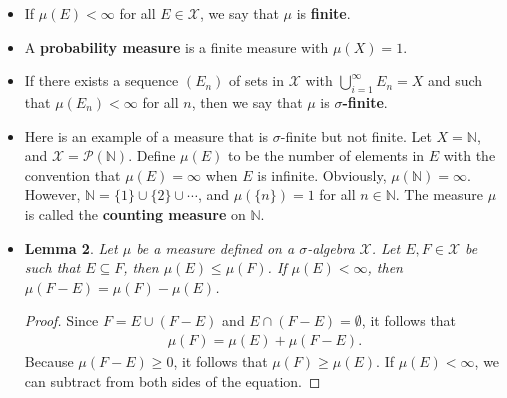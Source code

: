\documentclass[10pt]{article}
\newtheorem{lemma}{Lemma}
\newtheorem{definition}[lemma]{Definition}
\newcommand{\mcal}[1]{\mathcal{#1}}
\begin{document}
\begin{itemize}
  \begin{definition}
    Let $(X, \mcal{X})$ be a measurable space. A {\bf measure} is a function $\mu: \mcal{X} \rightarrow [0, \infty]$ with the following properties.
    \begin{enumerate}
      \item $\mu(\emptyset) = 0$.
      \item $\mu$ is {\bf countably additive}. That is, for a sequence $(E_n)$ of disjoint sets, it holds that
      \begin{align*}
        \mu\bigg( \bigcup_{n=1}^\infty E_n \bigg) = \sum_{n=1}^\infty \mu(E_n).
      \end{align*}
    \end{enumerate}
  \end{definition}
  
  \item If $\mu(E) < \infty$ for all $E \in \mcal{X}$, we say that $\mu$ is {\bf finite}.
  
  \item A {\bf probability measure} is a finite measure with $\mu(X) = 1$.
  
  \item If there exists a sequence $(E_n)$ of sets in $\mcal{X}$ with $\bigcup_{i=1}^\infty E_n = X$ and such that $\mu(E_n) < \infty$ for all $n$, then we say that $\mu$ is {\bf $\sigma$-finite}.
  
  \item Here is an example of a measure that is $\sigma$-finite but not finite. Let $X = \mathbb{N}$, and $\mcal{X} = \mcal{P}(\mathbb{N})$. Define $\mu(E)$ to be the number of elements in $E$ with the convention that $\mu(E) = \infty$ when $E$ is infinite. Obviously, $\mu(\mathbb{N}) = \infty$. However, $\mathbb{N} = \{ 1 \} \cup \{ 2 \} \cup \dotsb$, and $\mu(\{ n \}) = 1$ for all $n \in \mathbb{N}$. The measure $\mu$ is called the {\bf counting measure} on $\mathbb{N}$.

  \item \begin{lemma} \label{lemma:proper-difference-measure}
    Let $\mu$ be a measure defined on a $\sigma$-algebra $\mcal{X}$. Let $E, F \in \mcal{X}$ be such that $E \subseteq F$, then $\mu(E) \leq \mu(F)$. If $\mu(E) < \infty$, then $\mu(F - E) = \mu(F) - \mu(E)$.
  \end{lemma}

  \begin{proof}
    Since $F = E \cup (F - E)$ and $E \cap (F - E) = \emptyset$, it follows that
    \begin{align*}
        \mu(F) = \mu(E) + \mu(F - E).
    \end{align*}
    Because $\mu(F - E) \geq 0$, it follows that $\mu(F) \geq \mu(E)$. If $\mu(E) < \infty$, we can subtract from both sides of the equation.
  \end{proof}


\end{itemize}
\end{document}
